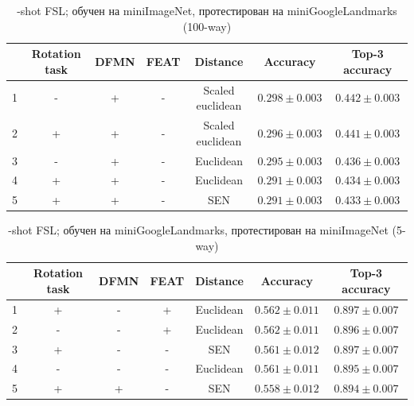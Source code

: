 \documentclass[a4paper, 12pt]{report}
\begin{document}
 \begin{table}[H]
\begin{adjustbox}{center}
\begin{tabular}{| r | c c c c | c |  c | }
\hline
    & Rotation task   & DFMN   & FEAT   & Distance         & Accuracy         & Top-3 accuracy   \\
    \hline
  1 & -               & +      & -      & Scaled euclidean & $0.298 \pm 0.003$ & $0.442 \pm 0.003$ \\
    \hline
  2 & +               & +      & -      & Scaled euclidean & $0.296 \pm 0.003$ & $0.441 \pm 0.003$ \\
    \hline
  3 & -               & +      & -      & Euclidean        & $0.295 \pm 0.003$ & $0.436 \pm 0.003$ \\
    \hline
  4 & +               & +      & -      & Euclidean        & $0.291 \pm 0.003$ & $0.434 \pm 0.003$ \\
    \hline
  5 & +               & +      & -      & SEN              & $0.291 \pm 0.003$ & $0.433 \pm 0.003$ \\
\hline
\end{tabular}
\end{adjustbox}
\caption{-shot FSL; обучен на miniImageNet, протестирован на miniGoogleLandmarks (100-way)}
\end{table}

\begin{table}[H]
\begin{adjustbox}{center}
\begin{tabular}{| r | c c c c | c |  c | }
\hline
    & Rotation task   & DFMN   & FEAT   & Distance         & Accuracy         & Top-3 accuracy   \\
    \hline
  1 & +               & -      & +      & Euclidean        & $0.562 \pm 0.011$ & $0.897 \pm 0.007$ \\
    \hline
  2 & -               & -      & +      & Euclidean        & $0.562 \pm 0.011$ & $0.896 \pm 0.007$ \\
    \hline
  3 & +               & -      & -      & SEN              & $0.561 \pm 0.012$ & $0.897 \pm 0.007$ \\
    \hline
  4 & -               & -      & -      & Euclidean        & $0.561 \pm 0.011$ & $0.895 \pm 0.007$ \\
    \hline
  5 & +               & +      & -      & SEN              & $0.558 \pm 0.012$ & $0.894 \pm 0.007$ \\
\hline
\end{tabular}
\end{adjustbox}
\caption{-shot FSL; обучен на miniGoogleLandmarks, протестирован на miniImageNet (5-way)}
\end{table}
\end{document}
